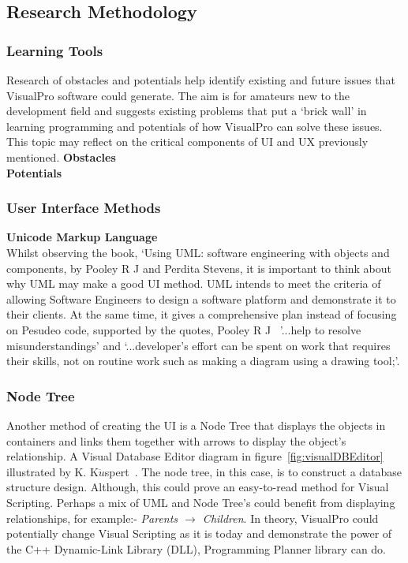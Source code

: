 \documentclass[conference]{IEEEtran}
\begin{document}
      \subsection{Research Methodology}
      \label{subsec:researchMethodology}
        \subsubsection{Learning Tools}
          Research of obstacles and potentials help identify existing and future issues that VisualPro software could generate. The aim is for amateurs new to the development field and suggests existing problems that put a `brick wall' in learning programming and potentials of how VisualPro can solve these issues. This topic may reflect on the critical components of UI and UX previously mentioned.
          \textbf{Obstacles}\\
          \textbf{Potentials}\\

        \subsubsection{User Interface Methods}
          \textbf{Unicode Markup Language}\\
            Whilst observing the book, `Using UML: software engineering with objects and components, by Pooley R J and Perdita Stevens\cite{pooley_r_j_using_2006}, it is important to think about why UML may make a good UI method. UML intends to meet the criteria of allowing Software Engineers to design a software platform and demonstrate it to their clients. At the same time, it gives a comprehensive plan instead of focusing on Pesudeo code, supported by the quotes, Pooley R J~\cite{pooley_r_j_using_2006} '...help to resolve misunderstandings' and `...developer's effort can be spent on work that requires their skills, not on routine work such as making a diagram using a drawing tool;'.  
          \subsubsection{Node Tree}
            Another method of creating the UI is a Node Tree that displays the objects in containers and links them together with arrows to display the object's relationship. A Visual Database Editor diagram in figure~\ref{fig:visualDBEditor} illustrated by K. K${\ddot{u}}$spert~\cite{kuspert_design_1990}. The node tree, in this case, is to construct a database structure design. Although, this could prove an easy-to-read method for Visual Scripting. Perhaps a mix of UML and Node Tree's could benefit from displaying relationships, for example:- \textit{Parents ${\to}$ Children}. In theory, VisualPro could potentially change Visual Scripting as it is today and demonstrate the power of the C++ Dynamic-Link Library (DLL), Programming Planner library can do.
\end{document}
